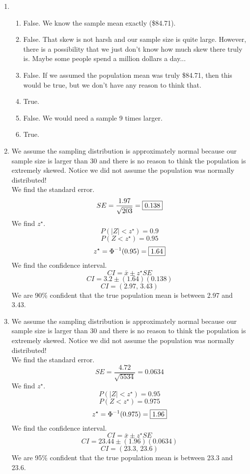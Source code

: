 \documentclass[12pt,letterpaper]{article}
\begin{document}
\begin{enumerate}
\item \begin{enumerate}
\item False. We know the sample mean exactly (\$84.71).
\item False. That skew is not harsh and our sample size is quite large. However, there is a possibility that we just don't know how much skew there truly is. Maybe some people spend a million dollars a day...
\item False. If we assumed the population mean was truly \$84.71, then this would be true, but we don't have any reason to think that.
\item True.
\item False. We would need a sample 9 times larger.
\item True.
\end{enumerate}

\item We assume the sampling distribution is approximately normal because our sample size is larger than 30 and there is no reason to think the population is extremely skewed. Notice we did not assume the population was normally distributed!\\
We find the standard error.
$$SE = \frac{1.97}{\sqrt{203}} = \fbox{0.138} $$
We find $z^\star$.
$$P(|Z| < z^\star) = 0.9 $$
$$P(Z < z^\star) = 0.95 $$
$$z^\star = \Phi^{-1}(0.95) = \fbox{1.64} $$
We find the confidence interval.
$$CI = \bar{x} \pm z^\star SE $$
$$CI = 3.2\pm (1.64)(0.138) $$
$$CI = (2.97,\, 3.43) $$
We are 90\% confident that the true population mean is between 2.97 and 3.43.

\item We assume the sampling distribution is approximately normal because our sample size is larger than 30 and there is no reason to think the population is extremely skewed. Notice we did not assume the population was normally distributed!\\
We find the standard error.
$$SE = \frac{4.72}{\sqrt{5534}} = 0.0634 $$
We find $z^\star$.
$$P(|Z| < z^\star) = 0.95 $$
$$P(Z < z^\star) = 0.975 $$
$$z^\star = \Phi^{-1}(0.975) = \fbox{1.96} $$
We find the confidence interval.
$$CI = \bar{x} \pm z^\star SE $$
$$CI = 23.44\pm (1.96)(0.0634) $$
$$CI = (23.3,\, 23.6) $$
We are 95\% confident that the true population mean is between 23.3 and 23.6.

\end{enumerate}
\end{document}

